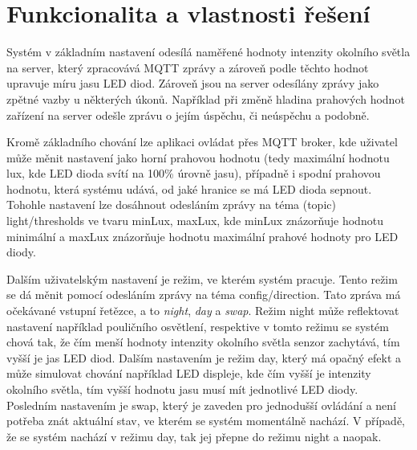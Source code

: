 \documentclass[a4paper, 11pt, hidelinks]{article}
\begin{document}
\section{Funkcionalita a vlastnosti řešení}
\label{functionality}
Systém v základním nastavení odesílá naměřené hodnoty intenzity okolního světla na server, který zpracovává MQTT zprávy a zároveň podle těchto hodnot upravuje míru jasu LED diod. Zároveň jsou na server odesílány zprávy jako zpětné vazby u některých úkonů. Například při změně hladina prahových hodnot zařízení na server odešle zprávu o jejím úspěchu, či neúspěchu a podobně.

Kromě základního chování lze aplikaci ovládat přes MQTT broker, kde uživatel může měnit nastavení jako horní prahovou hodnotu (tedy maximální hodnotu lux, kde LED dioda svítí na 100\% úrovně jasu), případně i spodní prahovou hodnotu, která systému udává, od jaké hranice se má LED dioda sepnout. Tohohle nastavení lze dosáhnout odesláním zprávy na téma (topic) light/thresholds ve tvaru minLux, maxLux, kde minLux znázorňuje hodnotu minimální a maxLux znázorňuje hodnotu maximální prahové hodnoty pro LED diody.

Dalším uživatelským nastavení je režim, ve kterém systém pracuje. Tento režim se dá měnit pomocí odesláním zprávy na téma config/direction. Tato zpráva má očekávané vstupní řetězce, a to \textit{night}, \textit{day} a \textit{swap}. Režim night může reflektovat nastavení například pouličního osvětlení, respektive v tomto režimu se systém chová tak, že čím menší hodnoty intenzity okolního světla senzor zachytává, tím vyšší je jas LED diod. Dalším nastavením je režim day, který má opačný efekt a může simulovat chování například LED displeje, kde čím vyšší je intenzity okolního světla, tím vyšší hodnotu jasu musí mít jednotlivé LED diody. Posledním nastavením je swap, který je zaveden pro jednodušší ovládání a není potřeba znát aktuální stav, ve kterém se systém momentálně nachází. V případě, že se systém nachází v režimu day, tak jej přepne do režimu night a naopak. 

\newpage


\end{document}
